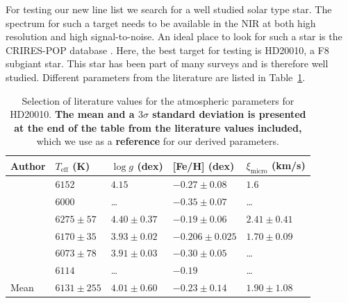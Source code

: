 \documentclass{aa}
\begin{document}
For testing our new line list we search for a well studied solar type
star. The spectrum for such a target needs to be available in the NIR at
both high resolution and high signal-to-noise. An ideal place to look
for such a star is the CRIRES-POP database \citep{Lebzelter2012}. Here,
the best target for testing is HD20010, a F8 subgiant star. This star
has been part of many surveys and is therefore well studied. Different
parameters from the literature are listed in Table~\ref{tab:parameters}.

\begin{table}[htb!]
    \caption{Selection of literature values for the atmospheric
    parameters for HD20010. \textbf{The mean and a $3 \sigma$ standard
    deviation is presented at the end of the table from the literature
    values included,} which we use as a \textbf{reference} for our
    derived parameters.}
    \label{tab:parameters}
    \centering
    \begin{tabular}{l|llll}
      \hline\hline
     Author                 & $T_\mathrm{eff}$ (K) & $\log g$ (dex)  &  [Fe/H] (dex)    & $\xi_\mathrm{micro}$ (km/s)  \\
      \hline
    \cite{Balachandran1990} & $6152$               & $4.15$          & $-0.27\pm0.08$   & $1.6$                        \\
    \cite{Favata1997}       & $6000$               & \ldots          & $-0.35\pm0.07$   & \ldots                       \\
    \cite{Santos2004}       & $6275\pm57$          & $4.40\pm0.37$   & $-0.19\pm0.06$   & $2.41\pm0.41$                \\
    \cite{Gonzalez2010}     & $6170\pm35$          & $3.93\pm0.02$   & $-0.206\pm0.025$ & $1.70\pm0.09$                \\
    \cite{Ramirez2012}      & $6073\pm78$          & $3.91\pm0.03$   & $-0.30\pm0.05$   & \ldots                       \\
    \cite{Mortier2013}      & $6114$               & \ldots          & $-0.19$          & \ldots                       \\
      \hline
      Mean                  & $6131\pm255$         & $4.01\pm0.60$   & $-0.23\pm0.14$   & $1.90\pm1.08$                \\
      \hline
    \end{tabular}
\end{table}
\end{document}
